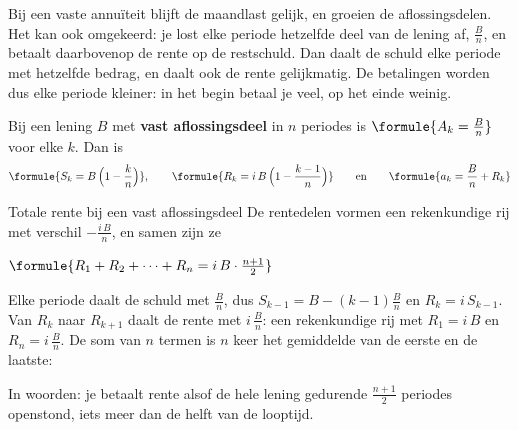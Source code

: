 Bij een vaste annuïteit blijft de maandlast gelijk, en groeien de aflossingsdelen. Het kan ook omgekeerd: je lost elke periode hetzelfde deel van de lening af, $\frac{B}{n}$, en betaalt daarbovenop de rente op de restschuld. Dan daalt de schuld elke periode met hetzelfde bedrag, en daalt ook de rente gelijkmatig. De betalingen worden dus elke periode kleiner: in het begin betaal je veel, op het einde weinig.

\begin{theorie}
Bij een lening $B$ met \textbf{\textcolor{accent}{vast aflossingsdeel}} in $n$ periodes is $\formule{A_k = \frac{B}{n}}$ voor elke $k$. Dan is
\[
\formule{S_k = B\,\Bigl(1 - \frac{k}{n}\Bigr)}, \qquad \formule{R_k = i\,B\,\Bigl(1 - \frac{k - 1}{n}\Bigr)} \qquad \text{en} \qquad \formule{a_k = \frac{B}{n} + R_k}
\]

\begin{stelling}{Totale rente bij een vast aflossingsdeel}
De rentedelen vormen een rekenkundige rij met verschil $-\frac{i\,B}{n}$, en samen zijn ze

\vspace{1mm}
\qquad $\formule{R_1 + R_2 + \cdots + R_n = i\,B \cdot \frac{n + 1}{2}}$
\end{stelling}

\begin{bewijs}
Elke periode daalt de schuld met $\frac Bn$, dus $S_{k-1} = B - (k - 1)\frac{B}{n}$ en $R_k = i\,S_{k-1}$. Van $R_k$ naar $R_{k+1}$ daalt de rente met $i\,\frac{B}{n}$: een rekenkundige rij met $R_1 = i\,B$ en $R_n = i\,\frac{B}{n}$. De som van $n$ termen is $n$ keer het gemiddelde van de eerste en de laatste:
\end{bewijs}
\end{theorie}

In woorden: je betaalt rente alsof de hele lening gedurende $\frac{n + 1}{2}$ periodes openstond, iets meer dan de helft van de looptijd.

